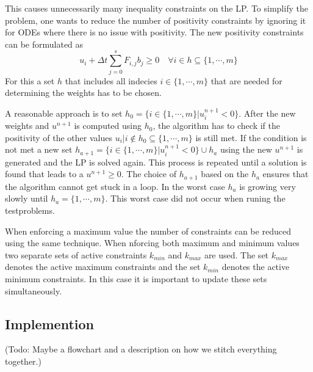 \documentclass[a4paper]{scrartcl}
\numberwithin{equation}{section}
\theoremstyle{plain}
\theoremstyle{definition}
\numberwithin{theorem}{section}
\newcommand{\dt}{{\Delta t}}
\newcommand{\1}{\mathbbm{1}}
\begin{document}
This causes unnecessarily many inequality constraints on the LP. To simplify the problem, one wants to reduce the number of positivity constraints by ignoring it for ODEs where there is no issue with positivity.
The new positivity constraints can be formulated as
\begin{equation}
u_i + \dt \sum_{j=0}^s F_{i,j}  b_j  \geq 0 \quad   \forall {i \in h \subseteq \{1,\cdots,m \}} 
\end{equation}
For this a set $h$ that includes all indecies $i \in \{1,\cdots,m \}$ that are needed for determining the weights has to be chosen.

A reasonable approach is to set $h_0 = \{ i \in \{1,\cdots,m \} |  u_i^{n+1}  < 0 \}$. 
After the new weights and $u^{n+1}$ is computed using $h_0$, the algorithm has to check if the positivity of the other values $u_i | i \notin h_0 \subseteq \{1,\cdots,m \}$ is still met. 
If the condition is not met a new set $h_{a+1} = \{ i \in \{1,\cdots,m \}|  u_i^{n+1}  < 0 \} \cup h_{a}$ using the new $u^{n+1}$ is generated and the LP is solved again. This process is repeated until a solution is found that leads to a $u^{n+1} \geq 0$. The choice of $h_{a+1}$ based on the $h_{a}$ ensures that the algorithm cannot get stuck in a loop. In the worst case $h_a$ is growing very slowly until $h_a = \{1,\cdots,m \}$. 
This worst case did not occur when runing the testproblems. 

When enforcing a maximum value the number of constraints can be reduced using the same technique. When nforcing both maximum and minimum values two separate sets of active constraints $k_{min}$ and $k_{max}$ are used. The set $k_{max}$ denotes the active maximum constraints and the set $k_{min}$ denotes the active minimum constraints. 
In this case it is important to update these sets simultaneously.  

\subsection{Implemention}
(Todo: Maybe a flowchart and a description on how we stitch everything together.) 
\end{document}
